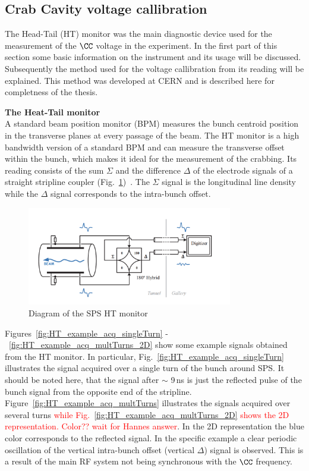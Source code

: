 \subsection{Crab Cavity voltage callibration}
The Head-Tail (HT) monitor was the main diagnostic device used for the measurement of the $\CC$ voltage in the experiment. In the first part of this section some basic information on the instrument and its usage will be discussed. Subsequently the method used for the voltage callibration from its reading will be explained. This method was developed at CERN and is described here for completness of the thesis.

\normalsize{\textbf{The Heat-Tail monitor}}\\
A standard beam position monitor (BPM) measures the bunch centroid position in the transverse planes at every passage of the beam. The HT monitor is a high bandwidth version of a standard BPM and can measure the transverse offset within the bunch, which makes it ideal for the measurement of the crabbing. Its reading consists of the sum $\Sigma$ and the  difference $\Delta$ of the electrode signals of a straight stripline coupler (Fig.~\ref{fig:SPS_HT_diagram})~\cite{Jones:987561, Levens:2313358}. The $\Sigma$ signal is the longitudinal line density while the $\Delta$ signal corresponds to the intra-bunch offset. 

\begin{figure}[!h]
   \centering         
   \includegraphics[width=0.8\textwidth]{images/Ch4/SPS_HT_monitor_diagram_modified.png}
       \caption{Diagram of the SPS HT monitor~\cite{Levens:2313358}}
       \label{fig:SPS_HT_diagram}
\end{figure}



Figures~\ref{fig:HT_example_acq_singleTurn} - ~\ref{fig:HT_example_acq_multTurns_2D} show some example signals obtained from the HT monitor. In particular, Fig.~\ref{fig:HT_example_acq_singleTurn} illustrates the signal acquired over a single turn of the bunch around SPS. It should be noted here, that the signal after $\sim$ 9\,ns is just the reflected pulse of the bunch signal from the opposite end of the stripline. Figure~\ref{fig:HT_example_acq_multTurns} illustrates the signals acquired over several turns \textcolor{red}{while Fig.~\ref{fig:HT_example_acq_multTurns_2D} shows the 2D representation. Color?? wait for Hannes answer}. In the 2D representation the blue color corresponds to the reflected signal. In the specific example a clear periodic oscillation of the vertical intra-bunch offset (vertical $\Delta$) signal is observed. This is a result of the main RF system not being synchronous with the  $\CC$  frequency. 


